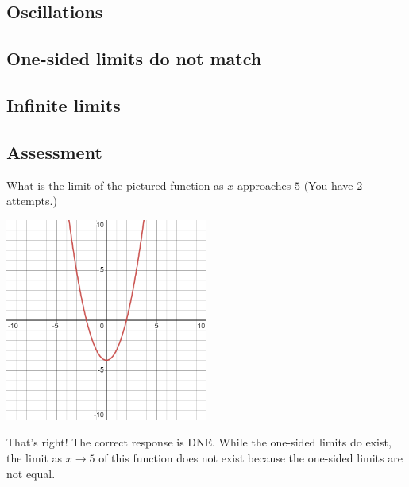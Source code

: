\documentclass{ximera}
\begin{document}
\subsection{Oscillations}
\begin{center}
\end{center}
\subsection{One-sided limits do not match}
\begin{center}
\end{center}
\subsection{Infinite limits}
\begin{center}
\end{center}
\subsection{Assessment}
\begin{question}
What is the limit of the pictured function as $x$ approaches $5$ (You have 2 attempts.)

\includegraphics[width=0.5\textwidth]{graph3.png}
\begin{multipleChoice}  
\end{multipleChoice}  

\begin{explanation}
    That's right! The correct response is DNE. While the one-sided limits do exist, the limit as $x \to 5$ of this function does not exist because the one-sided limits are not equal.
\end{explanation}
\end{question}
\end{document}
